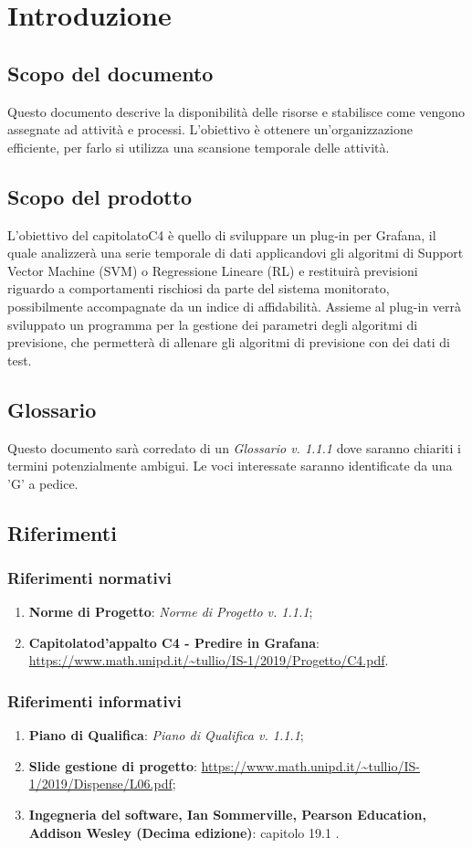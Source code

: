 \section{Introduzione}
	\subsection{Scopo del documento}
		Questo documento descrive la disponibilità delle risorse e stabilisce come vengono assegnate ad attività e processi\glo. L'obiettivo è ottenere un'organizzazione efficiente, per farlo si utilizza una scansione temporale delle attività.
	\subsection{Scopo del prodotto}
		L'obiettivo del capitolato\glosp C4 è quello di sviluppare un plug-in per Grafana\glo, il quale analizzerà una serie temporale di dati applicandovi gli algoritmi di Support Vector Machine (SVM\glo) o Regressione Lineare (RL\glo) e restituirà previsioni riguardo a comportamenti rischiosi da parte del sistema monitorato, possibilmente accompagnate da un indice di affidabilità. Assieme al plug-in verrà sviluppato un programma per la gestione dei parametri degli algoritmi di previsione, che permetterà di allenare gli algoritmi di previsione con dei dati di test.
	\subsection{Glossario}
		Questo documento sarà corredato di un \textit{Glossario v. 1.1.1} dove saranno chiariti i termini potenzialmente ambigui.
		Le voci interessate saranno identificate da una 'G' a pedice.
	\subsection{Riferimenti}
		\subsubsection{Riferimenti normativi}
			\begin{enumerate}
				\item \textbf{Norme di Progetto}: \textit{Norme di Progetto v. 1.1.1};
				\item \textbf{Capitolato}\glosp \textbf{d'appalto C4 - Predire in Grafana}\glo: \url{https://www.math.unipd.it/~tullio/IS-1/2019/Progetto/C4.pdf}.
			\end{enumerate}
		\subsubsection{Riferimenti informativi}
			\begin{enumerate}
				\item \textbf{Piano di Qualifica}: \textit{Piano di Qualifica v. 1.1.1};
				\item \textbf{Slide gestione di progetto}\glo: \url{https://www.math.unipd.it/~tullio/IS-1/2019/Dispense/L06.pdf};
				\item \textbf{Ingegneria del software, Ian Sommerville, Pearson Education, Addison Wesley (Decima edizione)}: capitolo 19.1 .
			\end{enumerate}
